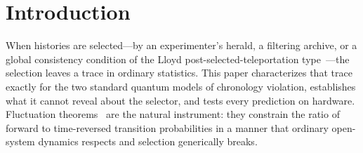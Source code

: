 \documentclass[aps,pra,twocolumn,superscriptaddress,nofootinbib]{revtex4-2}
\begin{document}
\maketitle

\section{Introduction}
When histories are selected---by an experimenter's herald, a filtering archive, or a global consistency condition of the Lloyd post-selected-teleportation type~\cite{lloyd2011prl,lloyd2011pra}---the selection leaves a trace in ordinary statistics. This paper characterizes that trace exactly for the two standard quantum models of chronology violation, establishes what it cannot reveal about the selector, and tests every prediction on hardware. Fluctuation theorems~\cite{jarzynski1997,crooks1999,talknerlutzhanggi2007,seifert2012} are the natural instrument: they constrain the ratio of forward to time-reversed transition probabilities in a manner that ordinary open-system dynamics respects and selection generically breaks.
\end{document}
